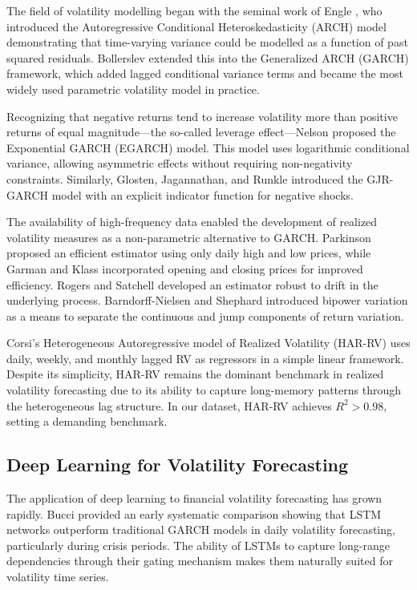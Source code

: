 The field of volatility modelling began with the seminal work of Engle \cite{engle1982}, who introduced the Autoregressive Conditional Heteroskedasticity (ARCH) model demonstrating that time-varying variance could be modelled as a function of past squared residuals. Bollerslev \cite{bollerslev1986} extended this into the Generalized ARCH (GARCH) framework, which added lagged conditional variance terms and became the most widely used parametric volatility model in practice.

Recognizing that negative returns tend to increase volatility more than positive returns of equal magnitude---the so-called leverage effect---Nelson \cite{nelson1991} proposed the Exponential GARCH (EGARCH) model. This model uses logarithmic conditional variance, allowing asymmetric effects without requiring non-negativity constraints. Similarly, Glosten, Jagannathan, and Runkle \cite{glosten1993} introduced the GJR-GARCH model with an explicit indicator function for negative shocks.

The availability of high-frequency data enabled the development of realized volatility measures as a non-parametric alternative to GARCH. Parkinson \cite{parkinson1980} proposed an efficient estimator using only daily high and low prices, while Garman and Klass \cite{garman1980} incorporated opening and closing prices for improved efficiency. Rogers and Satchell \cite{rogers1991} developed an estimator robust to drift in the underlying process. Barndorff-Nielsen and Shephard \cite{bns2004} introduced bipower variation as a means to separate the continuous and jump components of return variation.

Corsi's Heterogeneous Autoregressive model of Realized Volatility (HAR-RV) \cite{corsi2009} uses daily, weekly, and monthly lagged RV as regressors in a simple linear framework. Despite its simplicity, HAR-RV remains the dominant benchmark in realized volatility forecasting due to its ability to capture long-memory patterns through the heterogeneous lag structure. In our dataset, HAR-RV achieves $R^2 > 0.98$, setting a demanding benchmark.

\subsection{Deep Learning for Volatility Forecasting}

The application of deep learning to financial volatility forecasting has grown rapidly. Bucci \cite{bucci2020} provided an early systematic comparison showing that LSTM networks outperform traditional GARCH models in daily volatility forecasting, particularly during crisis periods. The ability of LSTMs to capture long-range dependencies through their gating mechanism makes them naturally suited for volatility time series.

